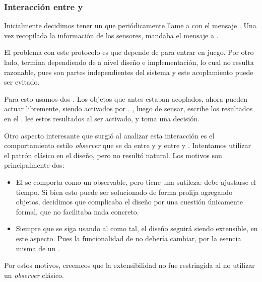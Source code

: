       \subsubsection{Interacci\'on entre \decisiones{} y \condiciones{}}
          Inicialmente decidimos tener un \timer{} que peri\'odicamente llame a \condiciones{}
          con el mensaje \sensarCondiciones{}. Una vez recopilada la informaci\'on de los
          sensores, \condiciones{} mandaba el mensaje \tomarDecisiones{} a \decisiones{}.

          El problema con este protocolo es que \decisiones{} depende de \condiciones{}
          para entrar en juego. Por otro lado, \condiciones{} termina dependiendo de
          \condiciones{} a nivel dise\~no e implementaci\'on, lo cual no resulta razonable,
          pues son partes independientes del sistema y este acoplamiento puede ser evitado.

          Para esto usamos dos \timer{}. Los objetos que antes estaban acoplados, ahora
          pueden actuar libremente, siendo activados por \timer{}. \condiciones{}, luego
          de sensar, escribe los resultados en el \historial{}. \decisiones{} lee estos
          resultados al ser activado, y toma una decisi\'on.

          Otro aspecto interesante que surgi\'o al analizar esta interacci\'on es
          el comportamiento estilo \textit{observer} que se da entre \timer{} y
          \condiciones{} y entre \timer{} y \decisiones{}. Intentamos utilizar el patr\'on
          cl\'asico en el dise\~no, pero no result\'o natural. Los motivos son
          principalmente dos:
          \begin{itemize}
              \item El \timer{} se comporta como un observable, pero tiene una sutileza:
                  debe ajustarse el tiempo. Si bien esto puede ser solucionado de
                  forma prolija agregando objetos, decidimos que complicaba el dise\~no
                  por una cuesti\'on \'unicamente formal, que no facilitaba nada
                  concreto.
              \item Siempre que se siga usando al \timer{} como tal, el dise\~no seguir\'a
                  siendo extensible, en este aspecto. Pues la funcionalidad de \timer{}
                  no deber\'ia cambiar, por la esencia misma de un \timer{}.
          \end{itemize}
          Por estos motivos, creemeos que la extensibilidad no fue restringida al
          no utilizar un \textit{observer} cl\'asico.

